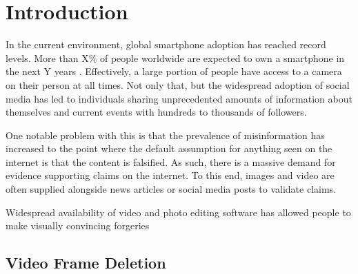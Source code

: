 \chapter{Introduction}

In the current environment, global smartphone adoption has reached record levels. More than X\% of people worldwide are expected to own a smartphone in the next Y years \cite{}. Effectively, a large portion of people have access to a camera on their person at all times. Not only that, but the widespread adoption of social media has led to individuals sharing unprecedented amounts of information about themselves and current events with hundreds to thousands of followers.

One notable problem with this is that the prevalence of misinformation has increased to the point where the default assumption for anything seen on the internet is that the content is falsified. As such, there is a massive demand for evidence supporting claims on the internet. To this end, images and video are often supplied alongside news articles or social media posts to validate claims.

Widespread availability of video and photo editing software has allowed people to make visually convincing forgeries

\section{Video Frame Deletion}